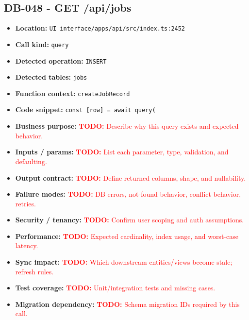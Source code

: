 \documentclass[11pt]{article}
\newcommand{\todoitem}[1]{\textcolor{red}{\textbf{TODO:} #1}}
\begin{document}
\subsection{DB-048 - GET /api/jobs}
\begin{itemize}[leftmargin=1.5em]
\item \textbf{Location:} \texttt{UI interface/apps/api/src/index.ts:2452}
\item \textbf{Call kind:} \texttt{query}
\item \textbf{Detected operation:} \texttt{INSERT}
\item \textbf{Detected tables:} \texttt{jobs}
\item \textbf{Function context:} \texttt{createJobRecord}
\item \textbf{Code snippet:} \texttt{const [row] = await query(}
\item \textbf{Business purpose:} \todoitem{Describe why this query exists and expected behavior.}
\item \textbf{Inputs / params:} \todoitem{List each parameter, type, validation, and defaulting.}
\item \textbf{Output contract:} \todoitem{Define returned columns, shape, and nullability.}
\item \textbf{Failure modes:} \todoitem{DB errors, not-found behavior, conflict behavior, retries.}
\item \textbf{Security / tenancy:} \todoitem{Confirm user scoping and auth assumptions.}
\item \textbf{Performance:} \todoitem{Expected cardinality, index usage, and worst-case latency.}
\item \textbf{Sync impact:} \todoitem{Which downstream entities/views become stale; refresh rules.}
\item \textbf{Test coverage:} \todoitem{Unit/integration tests and missing cases.}
\item \textbf{Migration dependency:} \todoitem{Schema migration IDs required by this call.}
\end{itemize}
\end{document}
